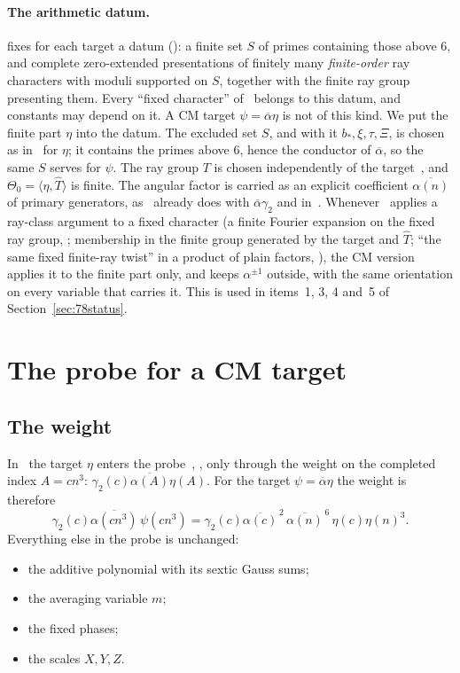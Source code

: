 \documentclass[11pt]{article}
\numberwithin{equation}{section}
\begin{document}
\paragraph{The arithmetic datum.} \cite{OAI78} fixes for each target a datum (\cite[Section~4.1]{OAI78}): a finite set
$S$ of primes containing those above $6$, and complete zero-extended presentations of finitely many
\emph{finite-order} ray characters with moduli supported on $S$, together with the finite ray group presenting
them. Every ``fixed character'' of~\cite{OAI78} belongs to this datum, and constants may depend on it. A CM target
$\psi=\overline\alpha\eta$ is not of this kind. We put the finite part $\eta$ into the datum. The excluded set $S$,
and with it $b_*,\xi,\tau,\Xi$, is chosen as in~\cite[Section~6.1]{OAI78} for $\eta$; it contains the primes above
$6$, hence the conductor of $\overline\alpha$, so the same $S$ serves for $\psi$. The ray group $T$ is chosen
independently of the target~\cite[Section~6.1]{OAI78}, and $\Theta_0=\langle\eta,\widehat T\rangle$ is finite. The angular
factor is carried as an explicit coefficient $\overline{\alpha(n)}$ of primary generators, as~\cite{OAI78} already
does with $\overline\alpha\gamma_2$ and in~\cite[eq.~(4.7)]{OAI78}. Whenever~\cite{OAI78} applies a ray-class
argument to a fixed character (a finite Fourier expansion on the fixed ray group, \cite[Section~4.2]{OAI78}; membership in the
finite group generated by the target and $\widehat T$; ``the same fixed finite-ray twist'' in a product of plain
factors, \cite[Section~4.1]{OAI78}), the CM version applies it to the finite part only, and keeps $\alpha^{\pm1}$ outside, with the
same orientation on every variable that carries it. This is used in items~1, 3, 4 and~5 of
Section~\ref{sec:78status}.

\section{The probe for a CM target}\label{sec:78probe}

\subsection{The weight}
In~\cite{OAI78} the target $\eta$ enters the probe~\cite[eq.~(6.1)]{OAI78},
\cite[\S3.1]{G78}, only through the weight on the completed index $A=cn^3$:
$\gamma_2(c)\overline{\alpha(A)}\eta(A)$. For the target $\psi=\overline\alpha\eta$ the weight is
therefore
\begin{equation}\label{eq:cm-weight}
 \gamma_2(c)\overline{\alpha(cn^3)}\,\psi(cn^3)
 =\gamma_2(c)\overline{\alpha(c)}^{\,2}\,\overline{\alpha(n)}^{\,6}\,\eta(c)\eta(n)^3 .
\end{equation}
Everything else in the probe is unchanged:
\begin{itemize}
\item the additive polynomial with its sextic Gauss sums;
\item the averaging variable $m$;
\item the fixed phases;
\item the scales $X,Y,Z$.
\end{itemize}
\end{document}
